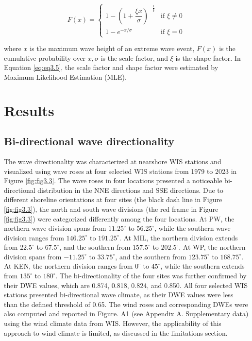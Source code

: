 \begin{equation}
    F(x) =
\begin{cases}
1 - \left(1 + \dfrac{\xi x}{\sigma} \right)^{-\frac{1}{\xi}} & \text{if } \xi \ne 0 \\
1 - e^{-x/\sigma} & \text{if } \xi = 0
\end{cases}
\label{eq:eq3.5}
\end{equation}

where $x$ is the maximum wave height of an extreme wave event, $F(x)$ is the cumulative probability over $x, \sigma$ is the scale factor, and $\xi$ is the shape factor. In Equation \ref{eq:eq3.5}, the scale factor and shape factor were estimated by Maximum Likelihood Estimation (MLE). 

\section{Results}
\label{c3_Results}

\subsection{Bi-directional wave directionality}
\label{c3_Bi-directional wave directionality}

The wave directionality was characterized at nearshore WIS stations and visualized using wave roses at four selected WIS stations from 1979 to 2023 in Figure \ref{fig:fig3.3}. The wave roses in four locations presented a noticeable bi-directional distribution in the NNE directions and SSE directions. Due to different shoreline orientations at four sites (the black dash line in Figure \ref{fig:fig3.3}), the north and south wave divisions (the red frame in Figure \ref{fig:fig3.3}) were categorized differently among the four locations. At PW, the northern wave division spans from $11.25^\circ$ to $56.25^\circ$, while the southern wave division ranges from $146.25^\circ$ to $191.25^\circ$. At MIL, the northern division extends from $22.5^\circ$ to $67.5^\circ$, and the southern from $157.5^\circ$ to $202.5^\circ$. At WP, the northern division spans from $-11.25^\circ$ to $33.75^\circ$, and the southern from $123.75^\circ$ to $168.75^\circ$. At KEN, the northern division ranges from $0^\circ$ to $45^\circ$, while the southern extends from $135^\circ$ to $180^\circ$. The bi-directionality of the four sites was further confirmed by their DWE values, which are 0.874, 0.818, 0.824, and 0.850. All four selected WIS stations presented bi-directional wave climate, as their DWE values were less than the defined threshold of 0.65. The wind roses and corresponding DWEs were also computed and reported in Figure. A1 (see Appendix A. Supplementary data) using the wind climate data from WIS. However, the applicability of this approach to wind climate is limited, as discussed in the limitations section.


